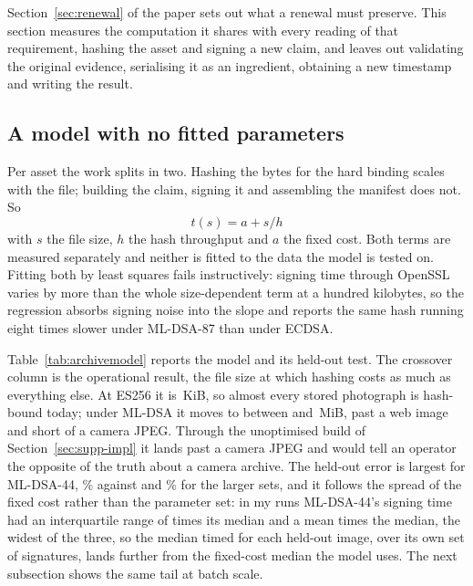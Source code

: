 Section~\ref{sec:renewal} of the paper sets out what a renewal must preserve.
This section measures the computation it shares with every reading of that
requirement, hashing the asset and signing a new claim, and leaves out
validating the original evidence, serialising it as an ingredient, obtaining a
new timestamp and writing the result.
\subsection{A model with no fitted parameters}

Per asset the work splits in two. Hashing the bytes for the hard binding
scales with the file; building the claim, signing it and assembling the
manifest does not. So
\renewcommand{\theequation}{S\arabic{equation}}
\begin{equation}
t(s) = a + s/h
\label{eq:resign}
\end{equation}
with $s$ the file size, $h$ the hash throughput and $a$ the fixed cost. Both
terms are measured separately and neither is fitted to the data the model is
tested on. Fitting both by least squares fails instructively: signing time
through OpenSSL varies by more than the whole size-dependent term at a hundred
kilobytes, so the regression absorbs signing noise into the slope and reports
the same hash running eight times slower under ML-DSA-87 than under ECDSA.



Table~\ref{tab:archivemodel} reports the model and its held-out test. The
crossover column is the operational result, the file size at which hashing
costs as much as everything else. At ES256 it is \NarchCrossES\,KiB, so almost
every stored photograph is hash-bound today; under ML-DSA it moves to between
\NarchCrossLo{} and \NarchCrossHi\,MiB, past a web image and short of a camera
JPEG. Through the unoptimised build of Section~\ref{sec:supp-impl} it lands past a camera JPEG and would tell an operator the opposite of the truth about a camera archive. The held-out error is largest for ML-DSA-44, \NarchHeldDSAfortyfour\% against \NarchHeldDSAsixtyfive{} and \NarchHeldDSAeightyseven\% for the larger sets, and it follows the spread of the fixed cost rather than the parameter set: in my runs ML-DSA-44's signing time had an interquartile range of \NarchIqrRelDSAfortyfour{} times its median and a mean \NarchTailOfDSAfortyfour{} times the median, the widest of the three, so the median timed for each held-out image, over its own set of signatures, lands further from the fixed-cost median the model uses. The next subsection shows the same tail at batch scale.

